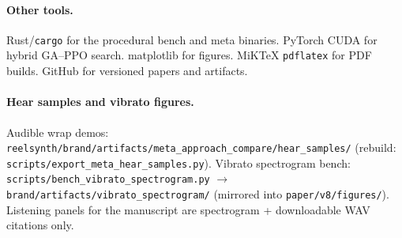 \paragraph{Other tools.}
Rust/\texttt{cargo} for the procedural bench and meta binaries. PyTorch CUDA
for hybrid GA--PPO search. matplotlib for figures. MiKTeX \texttt{pdflatex}
for PDF builds. GitHub for versioned papers and artifacts.

\paragraph{Hear samples and vibrato figures.}
Audible wrap demos: \texttt{reelsynth/brand/artifacts/meta\_approach\_compare/hear\_samples/}
(rebuild: \texttt{scripts/export\_meta\_hear\_samples.py}).
Vibrato spectrogram bench: \texttt{scripts/bench\_vibrato\_spectrogram.py}
$\to$ \texttt{brand/artifacts/vibrato\_spectrogram/} (mirrored into \texttt{paper/v8/figures/}).
Listening panels for the manuscript are spectrogram + downloadable WAV citations only.
